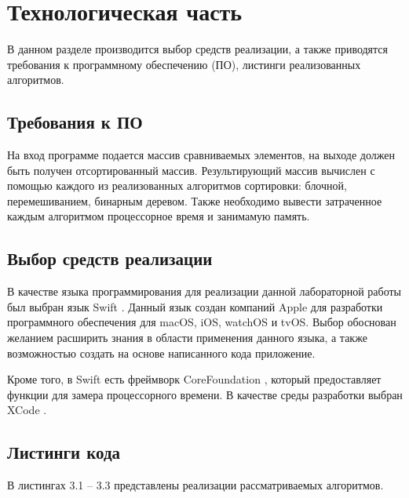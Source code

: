 \chapter{Технологическая часть}

В данном разделе производится выбор средств реализации, а также приводятся требования к программному обеспечению (ПО), листинги реализованных алгоритмов.

\section{Требования к ПО}

На вход программе подается массив сравниваемых элементов, на выходе должен быть получен отсортированный массив. Результирующий массив вычислен с помощью каждого из реализованных алгоритмов сортировки: блочной, перемешиванием, бинарным деревом. Также необходимо вывести затраченное каждым алгоритмом процессорное время и занимамую память.

\section{Выбор средств реализации}

В качестве языка программирования для реализации данной лабораторной работы был выбран язык Swift \cite{swift}. Данный язык создан компаний Apple для разработки программного обеспечения для macOS, iOS, watchOS и tvOS. Выбор обоснован желанием расширить знания в области применения данного языка, а также возможностью создать на основе написанного кода приложение.

Кроме того, в Swift есть фреймворк CoreFoundation \cite{core}, который предоставляет функции для замера процессорного времени. В качестве среды разработки выбран XCode \cite{xcode}.


\section{Листинги кода}

В листингах 3.1 -- 3.3 представлены реализации рассматриваемых алгоритмов.

